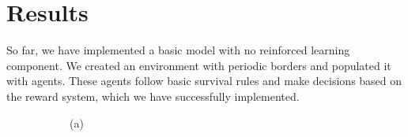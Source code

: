 \documentclass[9pt]{pnas-new}
\begin{document}
\section*{Results}

So far, we have implemented a basic model with no reinforced learning component. We created an environment with periodic borders and populated it with agents. These agents follow basic survival rules and make decisions based on the reward system, which we have successfully implemented.

\begin{figure}[ht]
	\centering
	\begin{subfigure}{0.30\textwidth}
		\centering
		\vspace{0.5em}
		\centering (a)
	\end{subfigure}
	\hfill
	\begin{subfigure}{0.30\textwidth}
		\centering

\end{subfigure}
\end{figure}
\end{document}
